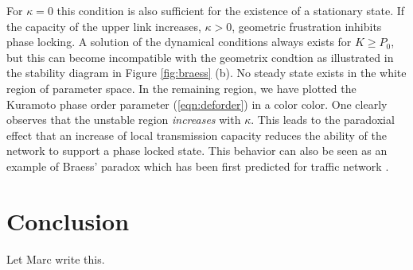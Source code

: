 \documentclass[10pt,aps,pra,twocolumn,superscriptaddress]{revtex4-1}
\begin{document}
For $\kappa = 0$ this condition is also sufficient for
the existence of a stationary state. If the capacity of the
upper link increases, $\kappa > 0$, geometric frustration
inhibits phase locking. A solution of the dynamical conditions
always  exists for   $K \ge P_0$, but this can become 
incompatible with the geometrix condtion as illustrated 
in the stability diagram  in Figure \ref{fig:braess} (b). No steady
state exists in the white region of parameter space. 
In the remaining region, we have plotted the Kuramoto phase 
order parameter (\ref{eqn:deforder})
in a color color.
One clearly observes that the unstable region \emph{increases} 
with $\kappa$. This leads to the paradoxial effect that
an increase of local transmission capacity reduces
the ability of the network to support a phase locked 
state. This behavior can also be seen as an example of 
Braess' paradox which has been first predicted for traffic 
network \cite{Brae68,12braess}.
 

\section{Conclusion}
Let Marc write this.





%


\end{document}
